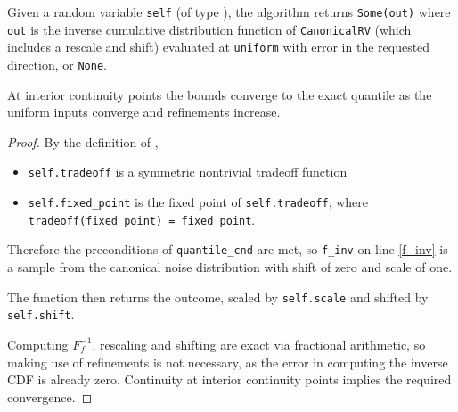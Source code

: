 \documentclass{article}
\begin{document}
\begin{theorem}
Given a random variable \texttt{self} (of type ),
the algorithm returns \texttt{Some(out)} where \texttt{out} is the inverse cumulative distribution function of \texttt{CanonicalRV} (which includes a rescale and shift) evaluated at \texttt{uniform}
with error in the requested direction, or \texttt{None}.

At interior continuity points the bounds converge to the exact quantile as the uniform inputs converge and refinements increase.
\end{theorem}

\begin{proof}

By the definition of ,
\begin{itemize}
    \item \texttt{self.tradeoff} is a symmetric nontrivial tradeoff function
    \item \texttt{self.fixed\_point} is the fixed point of \texttt{self.tradeoff}, where \texttt{tradeoff(fixed\_point) = fixed\_point}.
\end{itemize}

Therefore the preconditions of \texttt{quantile\_cnd} are met,
so \texttt{f\_inv} on line \ref{f_inv} is a sample from the canonical noise distribution with shift of zero and scale of one.

The function then returns the outcome, scaled by \texttt{self.scale} and shifted by \texttt{self.shift}.

Computing $F_f^{-1}$, rescaling and shifting are exact via fractional arithmetic,
so making use of refinements is not necessary,
as the error in computing the inverse CDF is already zero. Continuity at interior continuity points implies the required convergence.

\end{proof}
\end{document}
